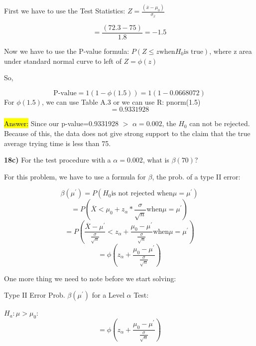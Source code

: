 \documentclass{article}
\begin{document}
First we have to use the Test Statistics: $Z=\frac{(\overline{x}-\mu_{0})}{\sigma_{\overline{x}}}$

$$=\frac{(72.3-75)}{1.8}=-1.5$$

\vspace{2mm}

Now we have to use the P-value formula: $P(Z \le z \text{when} H_{0} \text{is true})$, where z area under standard normal curve to left of $Z=\phi(z)$

\vspace{2mm}

So,

$$\text{P-value}=1(1-\phi(1.5))=1(1-0.0668072)$$
For $\phi(1.5)$, we can use Table A.3 or we can use R: pnorm(1.5)
$$=0.9331928$$

\vspace{2mm}

\hl{Answer:} Since our p-value=0.9331928 $>$ $\alpha=0.002$, the $ H_{0}$ can not be rejected. Because of this, the data does not give strong support to the claim that the true average trying time is less than 75. 




\vspace{5mm}
\textbf{18c)}  For the test procedure with a $\alpha=0.002$, what is $\beta(70)$?

\vspace{2mm}

For this problem, we have to use a formula for $\beta$, the prob. of a type II error:
\vspace{2mm}

$$\beta(\mu^{'})=P(H_{0} \text{is not rejected when}  \mu=\mu^{'})$$
$$=P(\overline{X}<\mu_{0}+z_{\alpha} * \frac{\sigma}{\sqrt{n}} \text{when} \mu=\mu^{'})$$
$$=P(\frac{\overline{X}-\mu^{'}}{\frac{\sigma}{\sqrt{n}}}<z_{\alpha}+\frac{\mu_{0}-\mu^{'}}{\frac{\sigma}{\sqrt{n}}}  \text{when} \mu=\mu^{'})$$
$$=\phi(z_{\alpha}+\frac{\mu_{0}-\mu^{'}}{\frac{\sigma}{\sqrt{n}}})$$

One more thing we need to note before we start solving: 

\vspace{2mm}

Type II Error Prob. $\beta(\mu^{'})$ for a Level $\alpha$ Test:

\vspace{2mm}

$H_{a}: \mu > \mu_{0}$:
\vspace{2mm}
$$=\phi(z_{\alpha}+\frac{\mu_{0}-\mu^{'}}{\frac{\sigma}{\sqrt{n}}})$$
\end{document}
